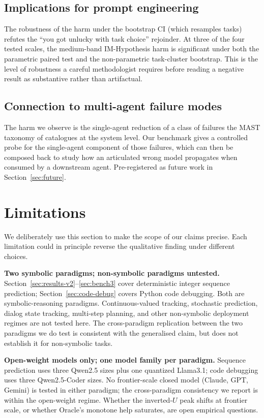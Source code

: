\documentclass[11pt]{article}
\begin{document}
\subsection{Implications for prompt engineering}

The robustness of the harm under the bootstrap CI (which
resamples tasks) refutes the
``you got unlucky with task choice'' rejoinder.  At three of the
four tested scales, the medium-band IM-Hypothesis harm is
significant under both the parametric paired test and the
non-parametric task-cluster bootstrap.  This is the level of
robustness a careful methodologist requires before reading a
negative result as substantive rather than artifactual.

\subsection{Connection to multi-agent failure modes}

The harm we observe is the single-agent reduction of a class of
failures the MAST taxonomy of \citet{cemri2025why} catalogues at
the system level.  Our benchmark gives a controlled probe for the
single-agent component of those failures, which can then be
composed back to study how an articulated wrong model propagates
when consumed by a downstream agent.  Pre-registered as future
work in Section~\ref{sec:future}.

\section{Limitations}
\label{sec:limitations}

We deliberately use this section to make the scope of our claims
precise.  Each limitation could in principle reverse the
qualitative finding under different choices.

\textbf{Two symbolic paradigms; non-symbolic paradigms untested.}
Section~\ref{sec:results-v2}--\ref{sec:bench3} cover deterministic
integer sequence prediction; Section~\ref{sec:code-debug} covers
Python code debugging.  Both are symbolic-reasoning paradigms.
Continuous-valued tracking, stochastic prediction, dialog state
tracking, multi-step planning, and other non-symbolic deployment
regimes are not tested here.  The cross-paradigm replication
between the two paradigms we do test is consistent with the
generalised claim, but does not establish it for non-symbolic
tasks.

\textbf{Open-weight models only; one model family per paradigm.}
Sequence prediction uses three Qwen2.5 sizes plus one quantized
Llama3.1; code debugging uses three Qwen2.5-Coder sizes.  No
frontier-scale closed model (Claude, GPT, Gemini) is tested in
either paradigm; the cross-paradigm consistency we report is
within the open-weight regime.  Whether the inverted-$U$ peak
shifts at frontier scale, or whether Oracle's monotone help
saturates, are open empirical questions.
\end{document}
